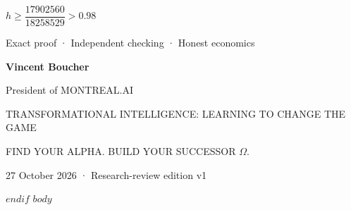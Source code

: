 \documentclass[11pt,a4paper]{article}
\begin{document}
\begin{titlepage}
\vspace{8mm}
{\fontsize{19}{24}\selectfont \(h\ge\dfrac{17902560}{18258529}>0.98\)}\par
{\sffamily\small Exact proof · Independent checking · Honest economics}\par
\vfill
{\sffamily\bfseries\large Vincent Boucher}\par
{\sffamily\normalsize President of MONTREAL.AI}\par
\vspace{6mm}
{\sffamily\fontsize{8.5}{11}\selectfont TRANSFORMATIONAL INTELLIGENCE: LEARNING TO CHANGE THE GAME}\par
{\sffamily\fontsize{10}{13}\selectfont\color{Gold}FIND YOUR ALPHA. BUILD YOUR SUCCESSOR \(\Omega\).}\par
\vspace{4mm}
{\sffamily\small 27 October 2026 · Research-review edition v1}\par
\end{titlepage}
\nopagecolor\color{black}
\setcounter{page}{1}
$endif$
$body$
\end{document}
